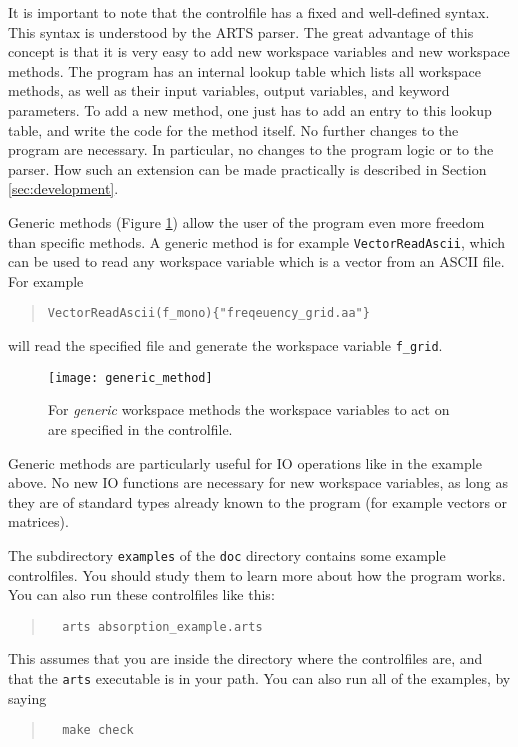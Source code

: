 It is important to note that the controlfile has a fixed and
well-defined syntax. This syntax is understood by the ARTS parser.
The great advantage of this concept is that it is very easy to add
new workspace variables and new workspace methods. The program has
an internal lookup table which lists all workspace methods, as well
as their input variables, output variables, and keyword
parameters. To add a new method, one just has to add an entry to
this lookup table, and write the code for the method itself. No
further changes to the program are necessary. In particular, no
changes to the program logic or to the parser. How such an extension
can be made practically is described in Section \ref{sec:development}.


\label{sec:concept:generic}

Generic methods (Figure \ref{fig:generic_method}) allow the user of the
program even more freedom than specific methods. A generic method is
for example \verb|VectorReadAscii|, which can be used to read any
workspace variable which is a vector from an ASCII file. For example
\begin{quote}
  \verb|VectorReadAscii(f_mono){"freqeuency_grid.aa"}|
\end{quote}
will read the specified file and generate the workspace variable
\verb|f_grid|.

\begin{figure}
  \begin{center}
    \texttt{[image: generic\_method]}
    \caption{For \emph{generic}
      workspace methods the workspace variables to act on are
        specified in the controlfile.}
    \label{fig:generic_method}
  \end{center}
\end{figure}

Generic methods are particularly useful for IO operations like in the
example above. No new IO functions are necessary for new workspace
variables, as long as they are of standard types already known to the
program (for example vectors or matrices). 

\label{sec:concept:practical}

The subdirectory \verb|examples| of the \verb|doc| directory contains
some example controlfiles. You should study them to learn more about
how the program works. You can also run these controlfiles like this:
\begin{quote}
\begin{verbatim}
  arts absorption_example.arts
\end{verbatim}
\end{quote}
This assumes that you are inside the directory where the controlfiles
are, and that the \verb|arts| executable is in your path.  You can
also run all of the examples, by saying
\begin{quote}
\begin{verbatim}
  make check
\end{verbatim}
\end{quote}

